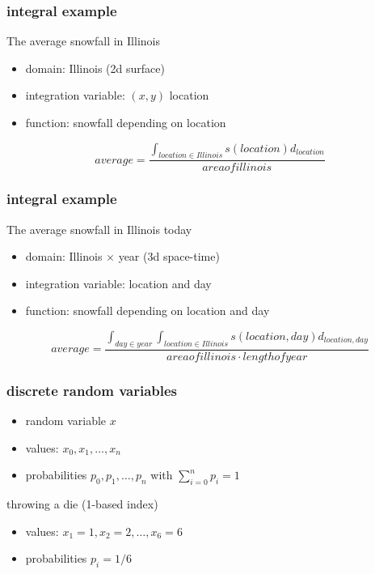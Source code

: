 \documentclass[10pt]{beamer}
\begin{document}
\begin{frame}
\frametitle{integral example}
The average snowfall in Illinois
  \begin{itemize}
    \item domain: Illinois (2d surface)
    \item integration variable: $(x,y)$ location
    \item function: snowfall depending on location
  \end{itemize}
\begin{equation*}
  average = \frac{\int_{location\in Illinois} s(location)d_{location}}{area of illinois}
\end{equation*}
\end{frame}
\begin{frame}
\frametitle{integral example}
The average snowfall in Illinois today
  \begin{itemize}
    \item domain: Illinois $\times$ year (3d space-time)
    \item integration variable: location and day
    \item function: snowfall depending on location and day
  \end{itemize}
\begin{equation*}
  average = \frac{\int_{day\in year}\int_{location\in Illinois}s(location,day)d_{location,day}}{area of illinois \cdot length of year}
\end{equation*}
\end{frame}
\begin{frame}
\frametitle{discrete random variables}
\begin{itemize}
  \item random variable $x$
  \item values: $x_0, x_1, \dots, x_n$
  \item probabilities $p_0, p_1,\dots,p_n$ with $\sum_{i=0}^{n}p_i = 1$
\end{itemize}
\begin{block}{throwing a die (1-based index)}
\begin{itemize}
  \item values: $x_1=1, x_2=2, \dots, x_6=6$
  \item probabilities $p_i = 1/6$
\end{itemize}
\end{block}  
\end{frame}
\end{document}
